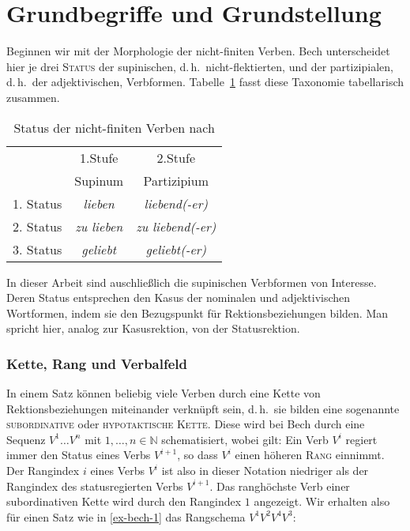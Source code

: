 \section{Grundbegriffe und Grundstellung} \label{sec-kohaerenz-einf}

Beginnen wir mit der Morphologie der nicht-finiten Verben. Bech unterscheidet hier je drei \textsc{Status} der supinischen, d.\,h.\ nicht-flektierten, und der partizipialen, d.\,h.\ der adjektivischen, Verb\-for\-men. Tabelle~\ref{fig-status} fasst diese Taxonomie tabellarisch zusammen.   
\begin{table}[t]
\begin{center}

\begin{tabular}{c|cc}
& 1.Stufe	& 2.Stufe 	\\
& Supinum	& Partizipium	\\
\hline
1. Status	& \emph{lieben}	& \emph{liebend(-er)}\\
2. Status	& \emph{zu lieben} & \emph{zu liebend(-er)}\\
3. Status	& \emph{geliebt}& \emph{geliebt(-er)}
\end{tabular}

\end{center}
\caption{Status der nicht-finiten Verben nach \cite{Bech:55} \label{fig-status}}
\end{table}
In dieser Arbeit sind auschlie\ss lich die supinischen Verb\-formen von Interesse. Deren Status entsprechen den Kasus der nominalen und adjektivischen Wortformen, indem sie den Bezugspunkt für Rektionsbeziehungen bilden. Man spricht hier, analog zur Kasusrektion, von der Statusrektion. 

\subsubsection*{Kette, Rang und Verbalfeld}

In einem Satz können beliebig viele Verben durch eine Kette von Rektionsbeziehungen miteinander verknüpft sein, d.\,h.\ sie bilden eine sogenannte \textsc{subordinative} oder \textsc{hypotaktische Kette}. Diese wird bei Bech durch eine Sequenz $V^{1} \ldots V^{n}$ mit $1, \ldots , n \in \mathbb{N}$ schematisiert, wobei gilt: Ein Verb $V^i$ regiert immer den Status eines Verbs $V^{i+1}$, so dass $V^i$ einen höheren \textsc{Rang} einnimmt. Der Rangindex $i$ eines Verbs $V^i$ ist also in dieser Notation niedriger als der Rangindex des statusregierten Verbs $V^{i+1}$. Das ranghöchste Verb einer subordinativen Kette wird durch den Rangindex $1$ angezeigt. Wir erhalten also für einen Satz wie in \ref{ex-bech-1} das Rangschema $V^1 V^2 V^4 V^3$:

